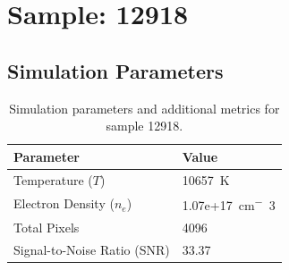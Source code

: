 \documentclass[a4paper,11pt]{article}
\begin{document}
\clearpage

\section{Sample: 12918}
\subsection{Simulation Parameters}
\begin{table}[h!]
    \centering
    \begin{tabular}{ll}
        \toprule
        \textbf{Parameter} & \textbf{Value} \\
        \midrule
        Temperature ($T$) & 10657 \,\si{K} \\
        Electron Density ($n_e$) & 1.07e+17 \,\si{cm^-3} \\
        Total Pixels & 4096 \\
        Signal-to-Noise Ratio (SNR) & 33.37 \\
        \bottomrule
    \end{tabular}
    \caption{Simulation parameters and additional metrics for sample 12918.}
    \label{tab:params_12918}
\end{table}
\end{document}
